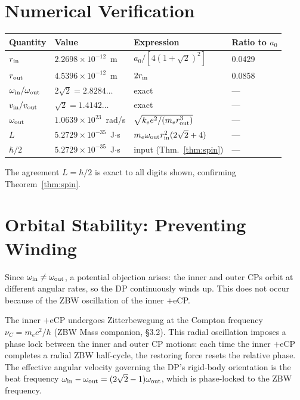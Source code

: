 \documentclass[12pt]{article}
\newcommand{\nuC}{\nu_C}
\newcommand{\rin}{r_{\rm in}}
\newcommand{\rout}{r_{\rm out}}
\newcommand{\oin}{\omega_{\rm in}}
\newcommand{\oout}{\omega_{\rm out}}
\newcommand{\aBohr}{a_0}
\begin{document}
\section{Numerical Verification}
\label{sec:verification}

\begin{center}
\renewcommand{\arraystretch}{1.4}
\begin{tabular}{@{}llll@{}}
\toprule
Quantity & Value & Expression & Ratio to $a_0$ \\
\midrule
$\rin$          & $2.2698\times 10^{-12}$~m
                & $\aBohr/[4(1+\sqrt{2})^2]$ & 0.0429 \\
$\rout$         & $4.5396\times 10^{-12}$~m
                & $2\rin$ & 0.0858 \\
$\oin/\oout$    & $2\sqrt{2} = 2.8284\ldots$
                & exact & --- \\
$v_{\rm in}/v_{\rm out}$ & $\sqrt{2} = 1.4142\ldots$
                & exact & --- \\
$\oout$         & $1.0639\times 10^{23}$~rad/s
                & $\sqrt{k_e e^2/(m_e\rout^3)}$ & --- \\
$L$             & $5.2729\times 10^{-35}$~J$\cdot$s
                & $m_e\oout\rin^2(2\sqrt{2}+4)$ & --- \\
$\hbar/2$       & $5.2729\times 10^{-35}$~J$\cdot$s
                & input (Thm.~\ref{thm:spin}) & --- \\
\bottomrule
\end{tabular}
\end{center}

The agreement $L = \hbar/2$ is exact to all digits shown, confirming
Theorem~\ref{thm:spin}.

\section{Orbital Stability: Preventing Winding}
\label{sec:stability}

Since $\oin \ne \oout$, a potential objection arises: the inner and
outer CPs orbit at different angular rates, so the DP continuously
winds up.  This does not occur because of the ZBW oscillation of the
inner $+$eCP.

The inner $+$eCP undergoes Zitterbewegung at the Compton frequency
$\nuC = m_e c^2/\hbar$ (ZBW Mass companion, \S3.2).  This radial
oscillation imposes a phase lock between the inner and outer CP
motions: each time the inner $+$eCP completes a radial ZBW half-cycle,
the restoring force resets the relative phase.  The effective angular
velocity governing the DP's rigid-body orientation is the
beat frequency $\oin - \oout = (2\sqrt{2}-1)\oout$, which is
phase-locked to the ZBW frequency.
\end{document}

